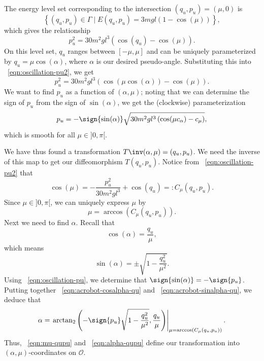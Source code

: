 The energy level set corresponding to the intersection \((q_u,p_u) = (\mu,0)\)
is 
\[
    \left\{(q_u,p_u) \in \Gamma \mid E(q_u,p_u) = 3mgl(1- \cos(\mu))\right\}
    ,
\]
which gives the relationship
\begin{equation}\label{eqn:oscillation-pu2}
    p_u^2 = 30m^2gl^3(\cos(q_u) - \cos(\mu))
    .
\end{equation}
On this level set, \(q_u\) ranges between \([-\mu,\mu]\) and can be uniquely
parameterized by \(q_u = \mu \cos(\alpha)\), where \(\alpha\) is our
desired pseudo-angle.
Substituting this into ~\eqref{eqn:oscillation-pu2}, we get
\[
    p_u^2 = 30m^2gl^3(\cos(\mu \cos(\alpha)) - \cos(\mu))
    .
\]
We want to find \(p_u\) as a function of \((\alpha,\mu)\); noting that we can
determine the sign of \(p_u\) from the sign of \(\sin(\alpha)\), we get the
(clockwise) parameterization
\begin{equation}\label{eqn:oscillation-pu}
    p_u = -\sign{\sin(\alpha)} \sqrt{30m^2gl^3 \left(\cos(\mu c_\alpha) - c_\mu\right)}
    ,
\end{equation}
which is smooth for all \(\mu \in ]0,\pi[\).

We have thus found a transformation \(T\inv(\alpha,\mu) = (q_u,p_u)\).
We need the inverse of this map to get our diffeomorphism \(T(q_u,p_u)\).
Notice from ~\eqref{eqn:oscillation-pu2} that
\[
    \cos(\mu) = -\frac{p_u^2}{30m^2gl^3} + \cos(q_u) =: C_\mu(q_u,p_u)
    .
\]
Since \(\mu \in ]0,\pi[\), we can uniquely express \(\mu\) by
\begin{equation}\label{eqn:mu-qupu}
    \mu = \arccos\left(C_\mu(q_u,p_u)\right)
    .
\end{equation}
Next we need to find \(\alpha\). 
Recall that 
\begin{equation}\label{eqn:acrobot-cosalpha-qu}
    \cos(\alpha) = \frac{q_u}{\mu}
    ,
\end{equation}
which means 
\begin{equation}\label{eqn:acrobot-sinalpha-qu}
    \sin(\alpha) = \pm \sqrt{1 - \frac{q_u^2}{\mu^2}}
    .
\end{equation}
Using ~\eqref{eqn:oscillation-pu}, we determine that
\(\sign{\sin(\alpha)} = -\sign{p_u}\).
Putting together ~\eqref{eqn:acrobot-cosalpha-qu} and
~\eqref{eqn:acrobot-sinalpha-qu}, we deduce that
\begin{equation}\label{eqn:alpha-qupu}
    \alpha = \left.
        \arctan_2\left( -\sign{p_u}\sqrt{1 - \frac{q_u^2}{\mu^2}}, \frac{q_u}{\mu}\right)
        \right|_{\mu = \arccos(C_\mu(q_u,p_u))}
    .
\end{equation}
Thus, ~\eqref{eqn:mu-qupu} and ~\eqref{eqn:alpha-qupu} define 
our transformation into \((\alpha,\mu)\)-coordinates on \(\mathcal{O}\).

